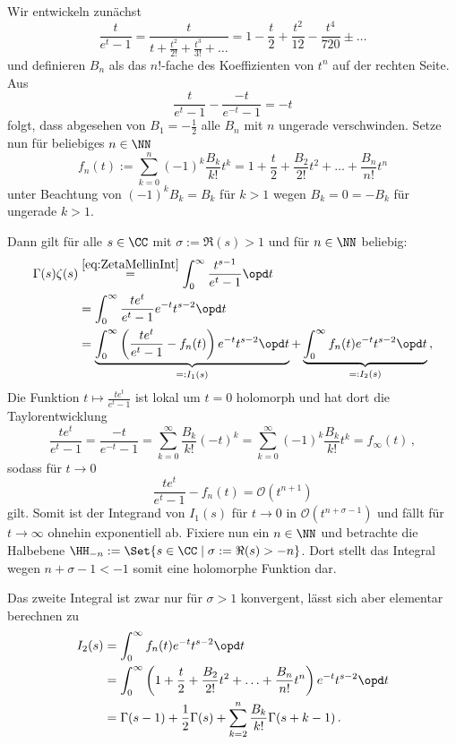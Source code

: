 \begin{bewe}
Wir entwickeln zunächst
\[
	\frac t{e^t - 1} = \frac t{t + \frac{t^2}{2!} + \frac {t^3}{3!} + \ldots} = 1 - \frac t2 + \frac {t^2}{12} - \frac {t^4}{720} \pm \ldots
\]
und definieren $B_n$ als das $n!$-fache des Koeffizienten von $t^n$ auf der rechten Seite. Aus
\[
	\frac t{e^t - 1} - \frac {-t}{e^{-t} - 1} = -t
\]
folgt, dass abgesehen von $B_1 = - \frac 12$ alle $B_n$ mit $n$ ungerade verschwinden. Setze nun für beliebiges $n \in \NN$
\[
	f_n(t) := \sum_{k=0}^n (-1)^k \frac {B_k}{k!} t^k = 1 + \frac t2 + \frac {B_2}{2!}t^2 + \ldots + \frac {B_n}{n!}t^n
\]
unter Beachtung von $(-1)^k B_k = B_k$ für $k > 1$ wegen $B_k = 0 = - B_k$ für ungerade $k > 1$. 

Dann gilt für alle $s \in \CC$ mit $\sigma := \Re(s) > 1$ und für $n \in \NN$ beliebig:
\begin{align*}
	\Gamma(s) \zeta(s) 
	&\overset{\eqref{eq:ZetaMellinInt}}= \int_0^\infty \frac {t^{s-1}}{e^t - 1} \opd t \\
	&= \int_0^\infty \frac {te^t}{e^t - 1} e^{-t} t^{s-2} \opd t \\
	&= \underbrace{\int_0^\infty \left( \frac {te^t}{e^t - 1} - f_n(t) \right) e^{-t} t^{s-2} \opd t}_{=: I_1(s)} + \underbrace{\int_0^\infty f_n(t) e^{-t} t^{s-2} \opd t}_{=: I_2(s)}
	\,,
\end{align*}
Die Funktion $t \mapsto \frac {te^t}{e^t - 1}$ ist lokal um $t = 0$ holomorph und hat dort die Taylorentwicklung
\[
	\frac {te^t}{e^t - 1} = \frac {-t}{e^{-t} - 1} = \sum_{k=0}^\infty \frac {B_k}{k!} (-t)^k = \sum_{k=0}^\infty (-1)^k \frac {B_k}{k!} t^k = f_\infty(t)
	\,,
\]
sodass für $t \to 0$
\[
	\frac {te^t}{e^t - 1} - f_n(t) = \mathcal O (t^{n+1})
\]
gilt. Somit ist der Integrand von $I_1(s)$ für $t \to 0$ in $\mathcal O (t^{n+\sigma-1})$ und fällt für $t \to \infty$ ohnehin exponentiell ab. Fixiere nun ein $n \in \NN$ und betrachte die Halbebene $\HH_{-n} := \Set {s \in \CC \mid \sigma := \Re(s) > -n}$. Dort stellt das Integral wegen $n+\sigma-1 < -1$ somit eine holomorphe Funktion dar.

Das zweite Integral ist zwar nur für $\sigma > 1$ konvergent, lässt sich aber elementar berechnen zu
\begin{align*}
	I_2(s) 
	&= \int_0^\infty f_n(t) e^{-t} t^{s-2} \opd t \\
	&= \int_0^\infty \left( 1 + \frac t2 + \frac {B_2}{2!}t^2 + \ldots + \frac {B_n}{n!}t^n \right) e^{-t} t^{s-2} \opd t \\
	&= \Gamma(s-1) + \frac 12 \Gamma(s) + \sum_{k=2}^n \frac {B_k}{k!} \Gamma(s+k-1)
	\,.
\end{align*}


\end{bewe}
